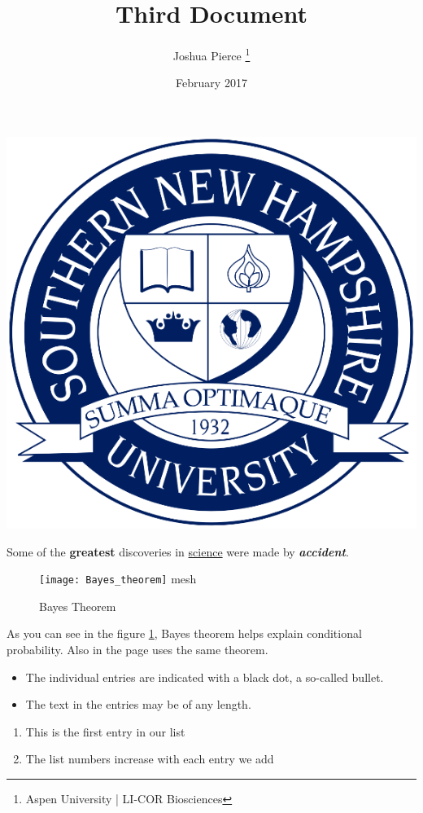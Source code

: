 \documentclass{article}
\title{Third Document}
\author{Joshua Pierce \thanks{Aspen University | LI-COR Biosciences}}
\date{February 2017}
\begin{document}
	
	\maketitle
	
	\begin{center}
		\includegraphics{snhu_logo.png}
	\end{center}
	
	Some of the \textbf{greatest} discoveries in \underline{science} were made by \textbf{\textit{accident}}.
	
	\begin{figure}[h]
		\centering
		\texttt{[image: Bayes\_theorem]}
	{mesh}
		\caption{Bayes Theorem}
		\label{fig:mesh1}
	\end{figure}

	As you can see in the figure \ref{fig:mesh1}, Bayes theorem helps explain conditional probability. Also in the page \pageref{fig:mesh1} uses the same theorem.
	
	\begin{itemize}
		\item The individual entries are indicated with a black dot, a so-called bullet.
		\item The text in the entries may be of any length.
	\end{itemize}

	\begin{enumerate}
		\item This is the first entry in our list
		\item The list numbers increase with each entry we add
	\end{enumerate}
\end{document}
